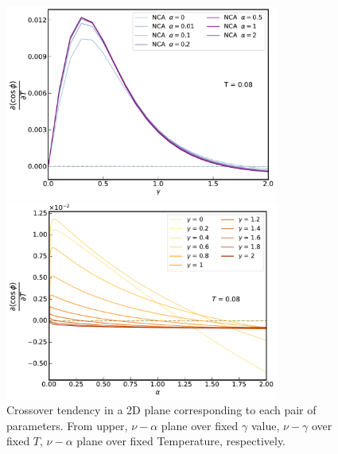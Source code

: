 \documentclass{article}[12pt]
\begin{document}
\begin{spacing}{1.3}
\begin{figure}[H]
  \centerline{\includegraphics[width=9cm]{TexFigure/4/4_3_11_1.pdf}}
  \centerline{\includegraphics[width=9cm]{TexFigure/4/4_3_11_2.pdf}}
  \caption{Crossover tendency in a 2D plane corresponding to each pair of parameters. From upper, $\nu - \alpha$ plane over fixed $\gamma$ value, $\nu - \gamma$ over fixed $T$, $\nu-\alpha$ plane over fixed Temperature, respectively.}
  \vfill
\end{figure}
\pagebreak
\newpage

\end{spacing}
\end{document}
